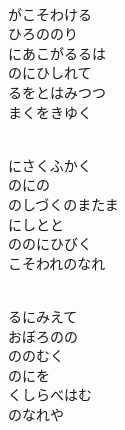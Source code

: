 \documentclass[10pt,b5j]{tarticle} %
\begin{document}
\vspace{1.5em} %
\newcommand{\linespace}{0.5em} %
\newcommand{\blocksize}{0.5\hsize} %
\newcommand{\itemmargin}{3em} %
\begin{enumerate} %
    \setlength{\itemindent}{\itemmargin} %
    \begin{minipage}[c]{\blocksize}
    
        \vspace{\linespace}
        \item~\\
        がこそわける\\
        ひろののり\\
        にあこがるるは\\
        のにひしれて\\
        るをとはみつつ\\
        まくをきゆく
        
    \end{minipage}
    \begin{minipage}[c]{\blocksize}
        
        \vspace{\linespace}
        \item~\\
        にさくふかく\\
        のにの\\
        のしづくのまたま\\
        にしとと\\
        ののにひびく\\
        こそわれのなれ
        
    \end{minipage}
    \begin{minipage}[c]{\blocksize}
        
        \vspace{\linespace}
        \item~\\
        るにみえて\\
        おぼろのの\\
        ののむく\\
        のにを\\
        くしらべはむ\\
        のなれや
        

\end{minipage}
\end{enumerate}
\end{document}
